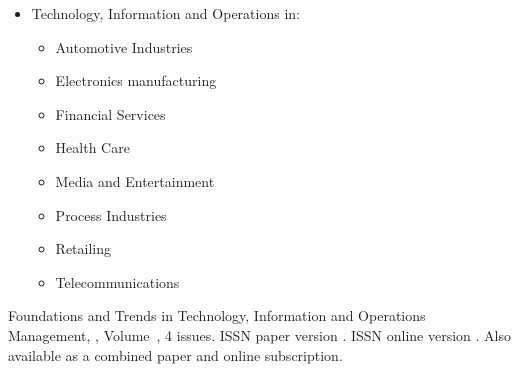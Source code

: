{\begin{multicols}{2}
\begin{itemize}
\item{Technology, Information and Operations in:}
	\begin{itemize}
	\item{Automotive Industries}
	\item{Electronics manufacturing}
	\item{Financial Services}
	\item{Health Care}
	\item{Media and Entertainment}
	\item{Process Industries}
	\item{Retailing}
	\item{Telecommunications}
	\end{itemize}
\end{itemize}
 \end{multicols}
 }


\journallibraryinfo
 {%
  Foundations and Trends\textsuperscript{\textregistered} in
  Technology, Information and Operations Management, ,
  Volume~, 4 issues.
  ISSN paper version .
  ISSN online version .
  Also available as a combined paper and online
  subscription.
 } 